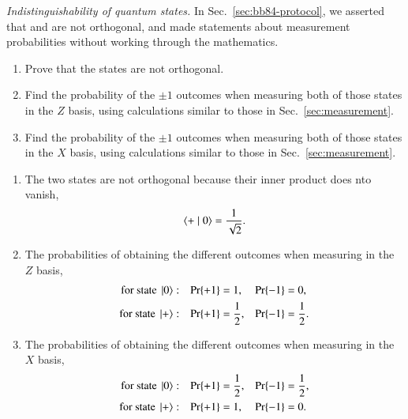 \begin{exercise}
\emph{Indistinguishability of quantum states.} In Sec.~\ref{sec:bb84-protocol}, we asserted that  and \ket{+} are not orthogonal, and made statements about measurement probabilities without working through the mathematics.
\begin{enumerate}[label=(\alph*)]
    \item Prove that the states are not orthogonal.
    \item Find the probability of the $\pm 1$ outcomes when measuring both of those states in the $Z$ basis, using calculations similar to those in Sec.~\ref{sec:measurement}.
    \item Find the probability of the $\pm 1$ outcomes when measuring both of those states in the $X$ basis, using calculations similar to those in Sec.~\ref{sec:measurement}.
\end{enumerate}
\end{exercise}
\begin{solution}
\begin{enumerate}[label=(\alph*)]
    \item The two states are not orthogonal because their inner product does nto vanish,
    \begin{equation*}
        \langle + \mid 0 \rangle = \frac{1}{\sqrt{2}}.
    \end{equation*}
    \item The probabilities of obtaining the different outcomes when measuring in the $Z$ basis,
    \begin{align*}
        \text{for state } \left| 0 \right\rangle&: & \text{Pr}\{+1\} & = 1, & \text{Pr}\{-1\} & = 0, \\
        \text{for state } \left| + \right\rangle&: & \text{Pr}\{+1\} & = \frac{1}{2}, & \text{Pr}\{-1\} & = \frac{1}{2}.
    \end{align*}
    \item The probabilities of obtaining the different outcomes when measuring in the $X$ basis,
    \begin{align*}
        \text{for state } \left| 0 \right\rangle&: & \text{Pr}\{+1\} & = \frac{1}{2}, & \text{Pr}\{-1\} & = \frac{1}{2}, \\
        \text{for state } \left| + \right\rangle&: & \text{Pr}\{+1\} & = 1, & \text{Pr}\{-1\} & = 0.
    \end{align*}
\end{enumerate}
\end{solution}

